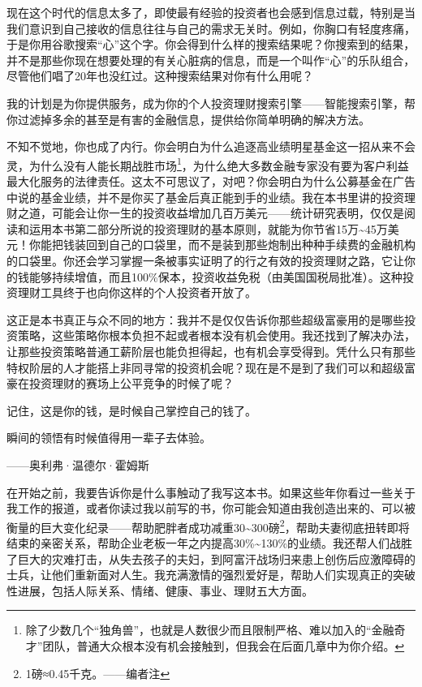 现在这个时代的信息太多了，即使最有经验的投资者也会感到信息过载，特别是当我们意识到自己接收的信息往往与自己的需求无关时。例如，你胸口有轻度疼痛，于是你用谷歌搜索“心”这个字。你会得到什么样的搜索结果呢？你搜索到的结果，并不是那些你现在想要处理的有关心脏病的信息，而是一个叫作“心”的乐队组合，尽管他们唱了20年也没红过。这种搜索结果对你有什么用呢？

我的计划是为你提供服务，成为你的个人投资理财搜索引擎——智能搜索引擎，帮你过滤掉多余的甚至是有害的金融信息，提供给你简单明确的解决方法。

不知不觉地，你也成了内行。你会明白为什么追逐高业绩明星基金这一招从来不会灵，为什么没有人能长期战胜市场\footnote{\label{fn:pdf-1-3}除了少数几个“独角兽”，也就是人数很少而且限制严格、难以加入的“金融奇才”团队，普通大众根本没有机会接触到，但我会在后面几章中为你介绍。}，为什么绝大多数金融专家没有要为客户利益最大化服务的法律责任。这太不可思议了，对吧？你会明白为什么公募基金在广告中说的基金业绩，并不是你买了基金后真正能到手的业绩。我在本书里讲的投资理财之道，可能会让你一生的投资收益增加几百万美元——统计研究表明，仅仅是阅读和运用本书第二部分所说的投资理财的基本原则，就能为你节省15万\textasciitilde{}45万美元！你能把钱装回到自己的口袋里，而不是装到那些炮制出种种手续费的金融机构的口袋里。你还会学习掌握一条被事实证明了的行之有效的投资理财之路，它让你的钱能够持续增值，而且100\%保本，投资收益免税（由美国国税局批准）。这种投资理财工具终于也向你这样的个人投资者开放了。

这正是本书真正与众不同的地方：我并不是仅仅告诉你那些超级富豪用的是哪些投资策略，这些策略你根本负担不起或者根本没有机会使用。我还找到了解决办法，让那些投资策略普通工薪阶层也能负担得起，也有机会享受得到。凭什么只有那些特权阶层的人才能搭上非同寻常的投资机会呢？现在是不是到了我们可以和超级富豪在投资理财的赛场上公平竞争的时候了呢？

记住，这是你的钱，是时候自己掌控自己的钱了。

\begin{BookQuote}
瞬间的领悟有时候值得用一辈子去体验。

\hfill ——奥利弗·温德尔·霍姆斯
\end{BookQuote}

在开始之前，我要告诉你是什么事触动了我写这本书。如果这些年你看过一些关于我工作的报道，或者你读过我以前写的书，你可能会知道由我创造出来的、可以被衡量的巨大变化纪录——帮助肥胖者成功减重30\textasciitilde{}300磅\footnote{\label{fn:pdf-1-4}1磅≈0.45千克。——编者注}，帮助夫妻彻底扭转即将结束的亲密关系，帮助企业老板一年之内提高30\%\textasciitilde{}130\%的业绩。我还帮人们战胜了巨大的灾难打击，从失去孩子的夫妇，到阿富汗战场归来患上创伤后应激障碍的士兵，让他们重新面对人生。我充满激情的强烈爱好是，帮助人们实现真正的突破性进展，包括人际关系、情绪、健康、事业、理财五大方面。

